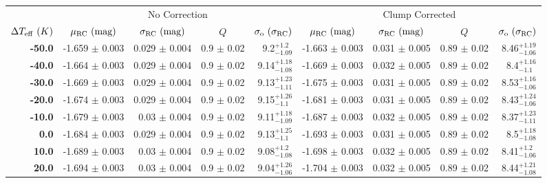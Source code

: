 \documentclass[fleqn,usenatbib]{mnras}
\begin{document}
\begin{table}
    \begin{tabular}{rrrrr|rrrr}
    \toprule
    {} & \multicolumn{4}{|c|}{No Correction} & \multicolumn{4}{|c|}{Clump Corrected} \\
    \cmidrule(lr){2-5}\cmidrule(lr){6-9}
    \multicolumn{1}{c}{$\Delta T_{\rm eff}\ (K)$} & \multicolumn{1}{c}{$\mu_{\rm RC}\ (\rm mag)$} & \multicolumn{1}{c}{$\sigma_{\rm RC}\ (\rm mag)$}  & \multicolumn{1}{c}{$Q$} &  \multicolumn{1}{c}{$\sigma_{\rm o}\ (\sigma_{\rm RC})$} & \multicolumn{1}{c}{$\mu_{\rm RC}\ (\rm mag)$} & \multicolumn{1}{c}{$\sigma_{\rm RC}\ (\rm mag)$}  & \multicolumn{1}{c}{$Q$} &  \multicolumn{1}{c}{$\sigma_{\rm o}\ (\sigma_{\rm RC})$} \\
    \midrule
        \textbf{-50.0} & -1.659 $\pm$ 0.003 &  0.029 $\pm$ 0.004 &  0.9 $\pm$ 0.02 &   9.2$_{-1.09}^{+ 1.2}$    &  -1.663 $\pm$ 0.003 &   0.031 $\pm$ 0.005 &  0.89 $\pm$ 0.02 &   8.46$_{-1.06}^{+1.19}$   \\
        \textbf{-40.0} & -1.664 $\pm$ 0.003 &  0.029 $\pm$ 0.004 &  0.9 $\pm$ 0.02 &  9.14$_{-1.08}^{+1.18}$    &  -1.669 $\pm$ 0.003 &   0.032 $\pm$ 0.005 &  0.89 $\pm$ 0.02 &    8.4$_{- 1.1}^{+1.16}$    \\
        \textbf{-30.0} & -1.669 $\pm$ 0.003 &  0.029 $\pm$ 0.004 &  0.9 $\pm$ 0.02 &  9.13$_{-1.11}^{+1.23}$    &  -1.675 $\pm$ 0.003 &   0.031 $\pm$ 0.005 &  0.89 $\pm$ 0.02 &   8.53$_{-1.06}^{+1.16}$   \\
        \textbf{-20.0} & -1.674 $\pm$ 0.003 &  0.029 $\pm$ 0.004 &  0.9 $\pm$ 0.02 &  9.15$_{- 1.1}^{+1.26}$    &  -1.681 $\pm$ 0.003 &   0.031 $\pm$ 0.005 &  0.89 $\pm$ 0.02 &   8.43$_{-1.06}^{+1.24}$    \\
        \textbf{-10.0} & -1.679 $\pm$ 0.003 &   0.03 $\pm$ 0.004 &  0.9 $\pm$ 0.02 &  9.11$_{-1.09}^{+1.18}$    &  -1.687 $\pm$ 0.003 &   0.032 $\pm$ 0.005 &  0.89 $\pm$ 0.02 &   8.37$_{-1.11}^{+1.23}$   \\
        \textbf{0.0  } & -1.684 $\pm$ 0.003 &  0.029 $\pm$ 0.004 &  0.9 $\pm$ 0.02 &  9.13$_{- 1.1}^{+1.25}$    &  -1.693 $\pm$ 0.003 &   0.031 $\pm$ 0.005 &  0.89 $\pm$ 0.02 &    8.5$_{-1.08}^{+1.18}$    \\
        \textbf{10.0 } & -1.689 $\pm$ 0.003 &   0.03 $\pm$ 0.004 &  0.9 $\pm$ 0.02 &  9.08$_{-1.08}^{+ 1.2}$    &  -1.698 $\pm$ 0.003 &   0.032 $\pm$ 0.005 &  0.89 $\pm$ 0.02 &   8.41$_{-1.06}^{+ 1.2}$   \\
        \textbf{20.0 } & -1.694 $\pm$ 0.003 &   0.03 $\pm$ 0.004 &  0.9 $\pm$ 0.02 &  9.04$_{-1.06}^{+1.26}$    &  -1.704 $\pm$ 0.003 &   0.032 $\pm$ 0.005 &  0.89 $\pm$ 0.02 &   8.44$_{-1.08}^{+1.21}$    \\

\end{tabular}
\end{table}
\end{document}
